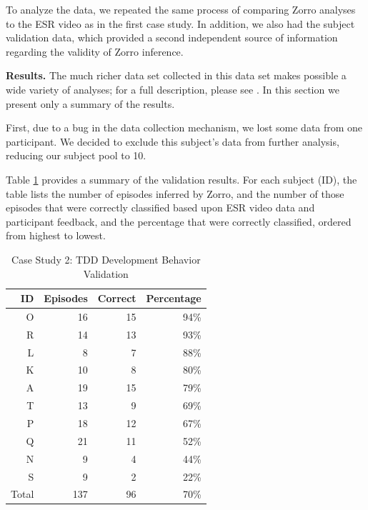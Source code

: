 \documentclass[smallextended]{svjour3}     %
\begin{document}
To analyze the data, we repeated the same process of comparing Zorro analyses to the ESR video as in the first case study.  In addition, we also had the subject validation data, which provided a second independent source of information regarding the validity of Zorro inference.  

{\bf Results.}  The much richer data set collected in this data set makes possible a wide variety of analyses; for a full description, please see \cite{csdl2-07-04}.  In this section we present only a summary of the results. 

First, due to a bug in the data collection mechanism, we lost some data
from one participant. We decided to exclude this subject's data from further analysis, reducing our subject pool to 10. 


Table \ref{tab:EpisodeBehaviorAgreed} provides a summary of the validation results. For each subject (ID), the table lists the number of episodes inferred by Zorro, and the number of those episodes that were correctly classified based upon ESR video data and participant feedback, and the percentage that were correctly classified, ordered from highest to lowest.

\begin{table}[ht]
\centering
  \caption{Case Study 2: TDD Development Behavior Validation}
  \begin{tabular}{|r|r|r|r|}
  \hline
    ID & Episodes  & Correct & Percentage \\ \hline
    O       & 16   &  15   & 94\% \\ \hline
    R       & 14   &  13   & 93\% \\ \hline
    L       &  8   &   7   & 88\% \\ \hline  
    K       & 10   &   8   & 80\% \\ \hline
    A       & 19   &  15   & 79\% \\ \hline  
    T       & 13   &   9   & 69\% \\ \hline
    P       & 18   &  12   & 67\% \\ \hline
    Q       & 21   &  11   & 52\% \\ \hline
    N       &  9   &   4   & 44\% \\ \hline
    S       &  9   &   2   & 22\% \\ \hline
    Total   & 137  &  96   & 70\% \\ \hline
    \end{tabular}
  \label{tab:EpisodeBehaviorAgreed} 
\end{table}
\end{document}
